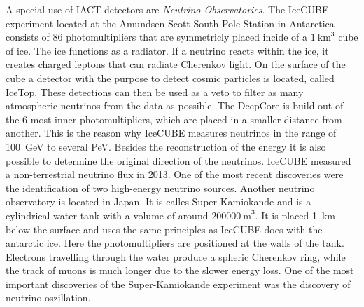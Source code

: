 A special use of IACT detectors are \textit{Neutrino Observatories}. The IceCUBE experiment located at the Amundsen-Scott South Pole Station in Antarctica consists of 86 photomultipliers that are symmetricly placed incide of a $\SI{1}{\kilo\meter}^3$ cube of ice. The ice functions as a radiator. If a neutrino reacts within the ice, it creates charged leptons that can radiate Cherenkov light. On the surface of the cube a detector with the purpose to detect cosmic particles is located, called IceTop. These detections can then be used as a veto to filter as many atmospheric neutrinos from the data as possible. The DeepCore is build out of the 6 most inner photomultipliers, which are placed in a smaller distance from another. This is the reason why IceCUBE measures neutrinos in the range of \SI{100}{\giga\electronvolt} to several \si{\peta\electronvolt}. Besides the reconstruction of the energy it is also possible to determine the original direction of the neutrinos. IceCUBE measured a non-terrestrial neutrino flux in 2013. One of the most recent discoveries were the identification of two high-energy neutrino sources. Another neutrino observatory is located in Japan. It is calles Super-Kamiokande and is a cylindrical water tank with a volume of around $\SI{200000}{\meter}^3$. It is placed \SI{1}{\kilo\meter} below the surface and uses the same principles as IceCUBE does with the antarctic ice. Here the photomultipliers are positioned at the walls of the tank. Electrons travelling through the water produce a spheric Cherenkov ring, while the track of muons is much longer due to the slower energy loss. One of the most important discoveries of the Super-Kamiokande experiment was the discovery of neutrino oszillation.

